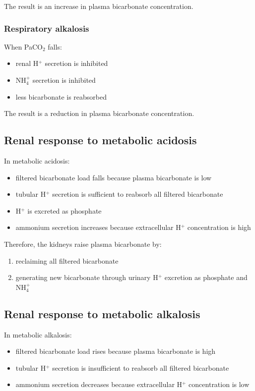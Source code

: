 \documentclass[11pt,a4paper]{article}
\begin{document}
The result is an increase in plasma bicarbonate concentration.

\subsubsection{Respiratory alkalosis}

When PaCO$_2$ falls:
\begin{itemize}
    \item renal H$^+$ secretion is inhibited
    \item NH$_4^+$ secretion is inhibited
    \item less bicarbonate is reabsorbed
\end{itemize}

The result is a reduction in plasma bicarbonate concentration.

\subsection{Renal response to metabolic acidosis}

In metabolic acidosis:
\begin{itemize}
    \item filtered bicarbonate load falls because plasma bicarbonate is low
    \item tubular H$^+$ secretion is sufficient to reabsorb all filtered bicarbonate
    \item H$^+$ is excreted as phosphate
    \item ammonium secretion increases because extracellular H$^+$ concentration is high
\end{itemize}

Therefore, the kidneys raise plasma bicarbonate by:
\begin{enumerate}
    \item reclaiming all filtered bicarbonate
    \item generating new bicarbonate through urinary H$^+$ excretion as phosphate and NH$_4^+$
\end{enumerate}

\subsection{Renal response to metabolic alkalosis}

In metabolic alkalosis:
\begin{itemize}
    \item filtered bicarbonate load rises because plasma bicarbonate is high
    \item tubular H$^+$ secretion is insufficient to reabsorb all filtered bicarbonate
    \item ammonium secretion decreases because extracellular H$^+$ concentration is low
\end{itemize}
\end{document}
